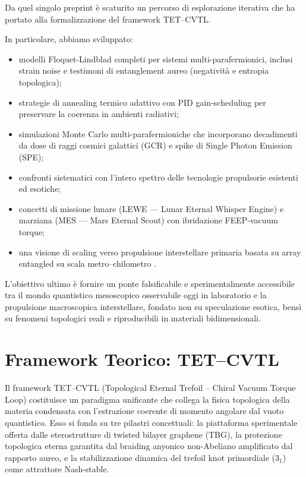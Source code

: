 \documentclass[11pt,a4paper]{article}
\let\oldcite\cite
\renewcommand{\cite}{\protect\oldcite}
\theoremstyle{plain}
\theoremstyle{definition}
\begin{document}
\vspace{0.4cm}

Da quel singolo preprint è scaturito un percorso di esplorazione iterativa che ha portato alla formalizzazione del framework TET--CVTL. 


\vspace{0.2cm}

In particolare, abbiamo sviluppato:
\begin{itemize}
    \item modelli Floquet-Lindblad completi per sistemi multi-parafermionici, inclusi strain noise e testimoni di entanglement aureo (negatività e entropia topologica);
    \item strategie di annealing termico adattivo con PID gain-scheduling per preservare la coerenza in ambienti radiativi;
    \item simulazioni Monte Carlo multi-parafermioniche che incorporano decadimenti da dose di raggi cosmici galattici (GCR) e spike di Single Photon Emission (SPE);
    \item confronti sistematici con l’intero spettro delle tecnologie propulsorie esistenti ed esotiche;
    \item concetti di missione lunare (LEWE — Lunar Eternal Whisper Engine) e marziana (MES — Mars Eternal Scout) con ibridazione FEEP-vacuum torque;
    \item una visione di scaling verso propulsione interstellare primaria basata su array entangled su scala metro–chilometro \cite{soliman2025p11b-topo,soliman2026yangmills-trefoil}.
\end{itemize}




\vspace{0.4cm}

L’obiettivo ultimo è fornire un ponte falsificabile e sperimentalmente accessibile tra il mondo quantistico mesoscopico osservabile oggi in laboratorio e la propulsione macroscopica interstellare, fondato non su speculazione esotica, bensì su fenomeni topologici reali e riproducibili in materiali bidimensionali.



\clearpage



\section{Framework Teorico: TET--CVTL}

Il framework TET--CVTL (Topological Eternal Trefoil -- Chiral Vacuum Torque Loop) costituisce un paradigma unificante che collega la fisica topologica della materia condensata con l'estrazione coerente di momento angolare dal vuoto quantistico. Esso si fonda su tre pilastri concettuali: la piattaforma sperimentale offerta dalle eterostrutture di twisted bilayer graphene (TBG), la protezione topologica eterna garantita dal braiding anyonico non-Abeliano amplificato dal rapporto aureo, e la stabilizzazione dinamica del trefoil knot primordiale ($3_1$) come attrattore Nash-stable.
\end{document}
